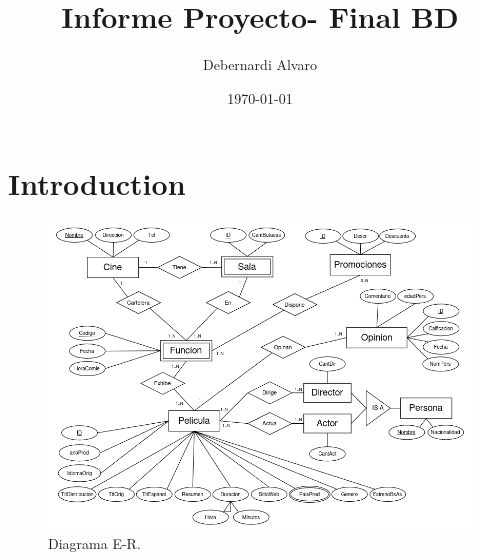 \documentclass{article}
\title{Informe Proyecto- Final BD}
\author{Debernardi Alvaro}
\date{\today}
\begin{document}
\maketitle

\section{Introduction}

  \begin{figure}[h]
    \centering
    \includegraphics[scale=0.6]{Diagramm.png}
    \caption{Diagrama E-R.}
    \label{fig:sample}
  \end{figure}
\end{document}
